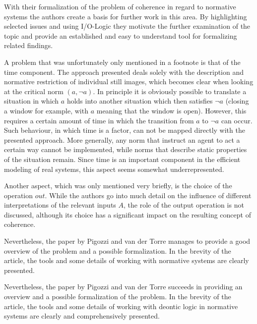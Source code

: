 \documentclass[12pt]{article}
\begin{document}
With their formalization of the problem of coherence in regard to normative systems the authors create a basis for further work in this area. By highlighting selected issues and using I/O-Logic they motivate the further examination of the topic and provide an established and easy to understand tool for formalizing related findings. 

A problem that was unfortunately only mentioned in a footnote is that of the time component. The approach presented deals solely with the description and normative restriction of individual still images, which becomes clear when looking at the critical norm $(a, \neg a)$. In principle it is obviously possible to translate a situation in which $a$ holds into another situation which then satisfies $\neg a$ (closing a window for example, with $a$ meaning that the window is open). However, this requires a certain amount of time in which the transition from $a$ to $\neg a$ can occur. Such behaviour, in which time is a factor, can not be mapped directly with the presented approach. More generally, any norm that instruct an agent to act a certain way cannot be implemented, while norms that describe static properties of the situation remain. Since time is an important component in the efficient modeling of real systems, this aspect seems somewhat underrepresented.

Another aspect, which was only mentioned very briefly, is the choice of the operation $\mathit{out}$. While the authors go into much detail on the influence of different interpretations of the relevant inputs $A$,  the role of the output operation is not discussed, although its choice has a significant impact on the resulting concept of coherence.

Nevertheless, the paper by Pigozzi and van der Torre manages to provide a good overview of the problem and a possible formalization. In the brevity of the article, the tools and some details of working with normative systems are clearly presented.

Nevertheless, the paper by Pigozzi and van der Torre succeeds in providing an overview and a possible formalization of the problem. In the brevity of the article, the tools and some details of working with deontic logic in normative systems are clearly and comprehensively presented.



\end{document}
